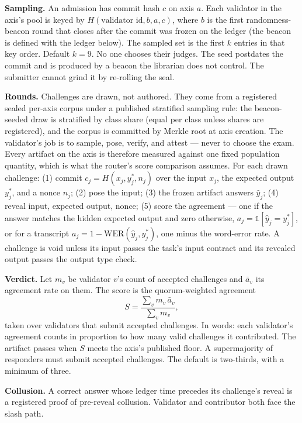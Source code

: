 \documentclass[11pt]{article}
\begin{document}
\textbf{Sampling.} An admission has commit hash $c$ on axis $a$.
Each validator in the axis's pool is keyed by
$H(\text{validator id}, b, a, c)$, where $b$ is the first
randomness-beacon round that closes after the commit was frozen
on the ledger (the beacon is defined with the ledger below). The
sampled set
is the first $k$ entries in that key order. Default $k=9$. No one
chooses their judges. The seed postdates the commit and is
produced by a beacon the librarian does not control. The
submitter cannot grind it by re-rolling the seal.

\textbf{Rounds.} Challenges are drawn, not authored. They
come from a registered sealed per-axis corpus under a published
stratified sampling rule: the beacon-seeded draw is stratified by
class share (equal per class unless shares are registered), and
the corpus is committed by Merkle root at axis creation. The
validator's job is to sample, pose, verify, and attest --- never
to choose the exam. Every artifact on the axis is therefore
measured against one fixed population quantity, which is what the
router's score comparison assumes. For each drawn
challenge: (1) commit
$c_j = H(x_j, y_j^*, n_j)$ over the input $x_j$, the expected
output $y_j^*$, and a nonce $n_j$; (2) pose the input; (3) the
frozen artifact answers $\hat y_j$; (4) reveal input, expected
output, nonce; (5) score the agreement --- one if the answer
matches the hidden expected output and zero otherwise,
$a_j = \mathbb{1}[\hat y_j = y_j^*]$, or for a transcript
$a_j = 1 - \mathrm{WER}(\hat y_j, y_j^*)$, one minus the
word-error rate. A challenge is void
unless its input passes the task's input contract and its
revealed output passes the output type check.

\textbf{Verdict.} Let $m_v$ be validator $v$'s count of accepted
challenges and $\bar a_v$ its agreement rate on them. The score
is the quorum-weighted agreement
\begin{equation}
S = \frac{\sum_{v} m_v \, \bar a_v}{\sum_{v} m_v},
\end{equation}
taken over validators that submit accepted challenges. In
words: each validator's agreement counts in proportion to how
many valid challenges it contributed. The artifact passes when
$S$ meets the axis's published floor. A
supermajority of responders must submit accepted challenges. The
default is two-thirds, with a minimum of three.

\textbf{Collusion.} A correct answer whose ledger time precedes
its challenge's reveal is a registered proof of pre-reveal
collusion. Validator and contributor both face the slash path.
\end{document}
